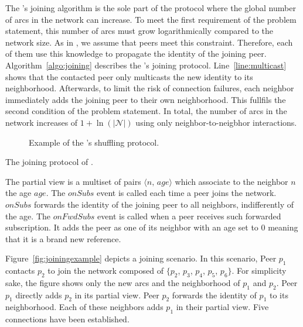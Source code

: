 The \SPRAY's joining algorithm is the sole part of the protocol where the
global number of arcs in the network can increase. To meet the first
requirement of the problem statement, this number of arcs must grow
logarithmically compared to the network size. As in \SCAMP, we assume that
peers meet this constraint. Therefore, each of them use this knowledge to
propagate the identity of the joining peer. Algorithm~\ref{algo:joining}
describes the \SPRAY's joining protocol. Line~\ref{line:multicast} shows that
the contacted peer only multicasts the new identity to its
neighborhood. Afterwards, to limit the risk of connection failures, each
neighbor immediately adds the joining peer to their own neighborhood. This
fullfils the second condition of the problem statement.  In total, the number
of arcs in the network increases of $1+\ln(|\mathcal{N}|)$ using only
neighbor-to-neigbhor interactions.

\begin{figure*}
  \centering
  \hspace{10pt}
  \hspace{10pt}
  \caption{\label{fig:cyclicexample}Example of the \SPRAY's shuffling
    protocol. }
\end{figure*}

\begin{algorithm}

\caption{\label{algo:joining}The joining protocol of \SPRAY.}
\end{algorithm}

The partial view is a multiset of pairs $\langle n,\, age\rangle$ which
associate to the neighbor $n$ the age $age$.  The $onSubs$ event is called each
time a peer joins the network. $onSubs$ forwards the identity of the joining
peer to all neighbors, indifferently of the age. The $onFwdSubs$ event is
called when a peer receives such forwarded subscription. It adds the peer as
one of its neighbor with an age set to $0$ meaning that it is a brand new
reference.

Figure~\ref{fig:joiningexample} depicts a joining scenario. In this scenario,
Peer $p_1$ contacts $p_2$ to join the network composed of $\{p_2$, $p_3$,
$p_4$, $p_5$, $p_6\}$. For simplicity sake, the figure shows only the new arcs
and the neighborhood of $p_1$ and $p_2$. Peer $p_1$ directly adds $p_2$ in its
partial view. Peer $p_2$ forwards the identity of $p_1$ to its
neighborhood. Each of these neighbors adds $p_1$ in their partial view. Five
connections have been established.

